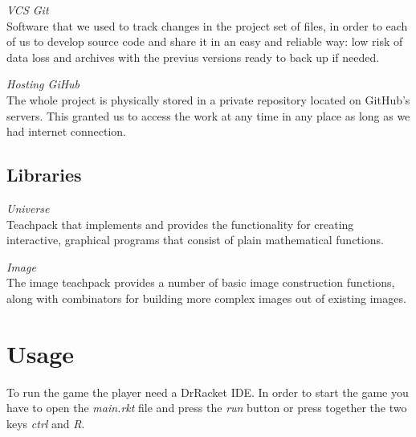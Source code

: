 \documentclass{article}
\begin{document}
 \textit{VCS Git}\\
Software that we used to track changes in the project set of files, in order to each of us to develop source code and share it in an easy and reliable way: low risk of data loss and archives with the previus versions ready to back up if needed.

 \textit{Hosting GiHub}\\
The whole project is physically stored in a private repository located on GitHub's servers. This granted us to access the work at any time in any place as long as we had internet connection.

\subsection{Libraries}
 \hspace{0.5cm}\textit{Universe}\\
 Teachpack that implements and provides the functionality for creating interactive, graphical programs that consist of plain mathematical functions.
 
 \textit{Image}\\
The image teachpack provides a number of basic image construction functions, along with combinators for building more complex images out of existing images.

 \section{Usage}
To run the game the player need a DrRacket IDE. In order to start the game you have to open the \textit{main.rkt} file and press the \textit{run} button or press together the two keys \textit{ctrl} and \textit{R}.

\end{document}
